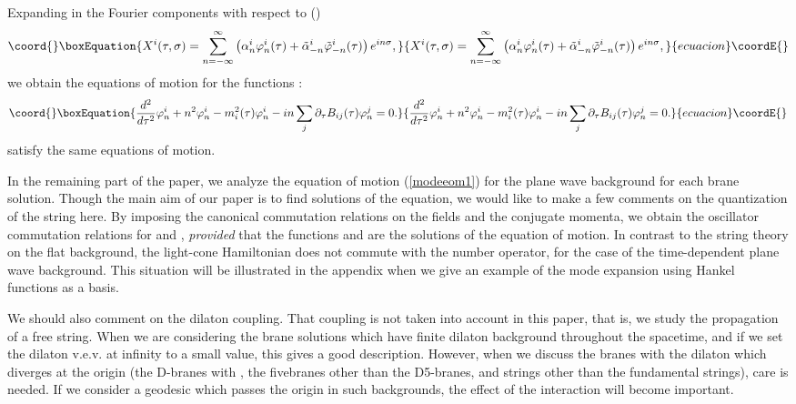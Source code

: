 \documentclass[a4paper,12pt]{article}
\begin{document}
Expanding \coordHE{} in the Fourier components with respect to 
\myHighlight{$\sigma$}\coordHE{} (\myHighlight{$0\le \sigma \le 2\pi$}\coordHE{}) 
\begin{equation}\coord{}\boxEquation{
X^{i}(\tau,\sigma)=\sum_{n=-\infty}^{\infty}\left(\alpha_{n}^{i}
\varphi^{i}_{n}(\tau)+ \tilde{\alpha}_{-n}^{i}
\tilde{\varphi}^{i}_{-n}(\tau) \right)
e^{in\sigma},
}{
X^{i}(\tau,\sigma)=\sum_{n=-\infty}^{\infty}\left(\alpha_{n}^{i}
\varphi^{i}_{n}(\tau)+ \tilde{\alpha}_{-n}^{i}
\tilde{\varphi}^{i}_{-n}(\tau) \right)
e^{in\sigma},
}{ecuacion}\coordE{}\end{equation}
we obtain the equations of motion for the functions 
\coordHE{}:
\begin{equation}\coord{}\boxEquation{
{d^2\over d\tau^2}\varphi^{i}_{n}
+n^2\varphi^{i}_{n} -m^{2}_{i}(\tau)\varphi^{i}_{n}
-in\sum_{j}\partial_\tau B_{ij}(\tau)\varphi^{j}_{n} =0.
\label{modeeom1}
}{
{d^2\over d\tau^2}\varphi^{i}_{n}
+n^2\varphi^{i}_{n} -m^{2}_{i}(\tau)\varphi^{i}_{n}
-in\sum_{j}\partial_\tau B_{ij}(\tau)\varphi^{j}_{n} =0.
}{ecuacion}\coordE{}\end{equation}
\coordHE{} satisfy the same equations
of motion.

In the remaining part of the paper, 
we analyze the equation of motion 
(\ref{modeeom1}) for the plane wave background for each 
brane solution. Though the main aim of our paper
is to find solutions of the equation, we  
would like to make a few comments on the
quantization of the string here.
By imposing the canonical commutation relations
on the fields \coordHE{} and the conjugate momenta, 
we obtain the oscillator commutation relations for 
\coordHE{} and \coordHE{}, 
{\it provided} that the functions
\coordHE{} and \coordHE{} are the solutions
of the equation of motion. In contrast to the string theory
on the flat background, the light-cone Hamiltonian
does not commute with the number operator, for the case
of the time-dependent plane wave background.
This situation will be illustrated in the appendix when 
we give an example of the mode expansion
using Hankel functions as a basis.

We should also comment on the dilaton coupling. That
coupling  is not taken into account
in this paper, that is,  we study the propagation of a free
string. When we are considering the brane solutions which
have finite dilaton background throughout the spacetime,
and if we set the dilaton v.e.v. at infinity to 
a small value, this gives a good description.
However, when we discuss the branes with the
dilaton which diverges at the origin (the D\coordHE{}-branes with
\coordHE{}, the \coordHE{} fivebranes other than the D5-branes,
and \coordHE{} strings other than the fundamental strings),
care is needed.
If we consider a geodesic which passes the origin in 
such backgrounds, the effect of the interaction 
will become important.
\end{document}
